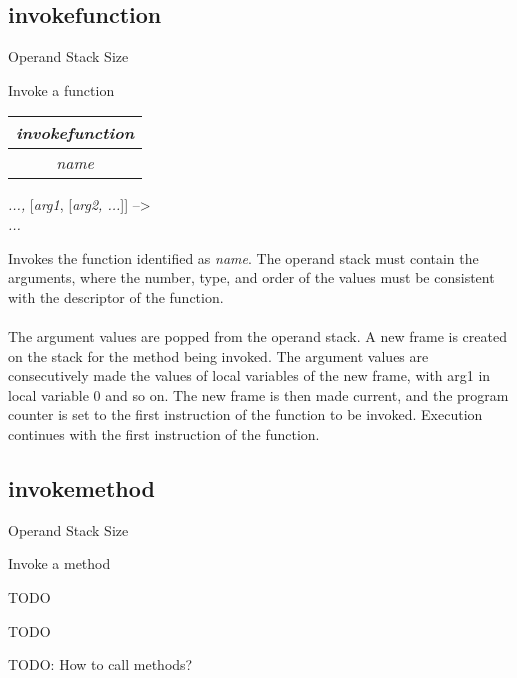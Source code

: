 \documentclass[12pt]{article}
\begin{document}
		\subsection*{invokefunction}
			\begin{labeling}{Operand Stack Size}
				\item [\textbf{Operation}] Invoke a function
				\item [\textbf{Format}] \begin{tabular}{| c |} \hline \textit{invokefunction} \\ \hline \textit{name} \\ \hline \end{tabular}
				\item [\textbf{Operand Stack}] \textit{..., }[\textit{arg1}, [\textit{arg2, ...}]] --\textgreater  \\
										\textit{...}
				\item [\textbf{Description}] Invokes the function identified as \textit{name}. The operand stack must contain the arguments, where the number, type, and order of the values must be consistent with the descriptor of the function. \\ \\
				 The argument values are popped from the operand stack. A new frame is created on the stack for the method being invoked. The argument values are consecutively made the values of local variables of the new frame, with arg1 in local variable 0 and so on. The new frame is then made current, and the program counter is set to the first instruction of the function to be invoked. Execution continues with the first instruction of the function.
			\end{labeling} 
		\newpage
		
		\subsection*{invokemethod}
			\begin{labeling}{Operand Stack Size}
				\item [\textbf{Operation}] Invoke a method
				\item [\textbf{Format}] TODO
				\item [\textbf{Operand Stack}] TODO
				\item [\textbf{Description}] TODO: How to call methods? 
			\end{labeling} 
		\newpage
		
\end{document}
